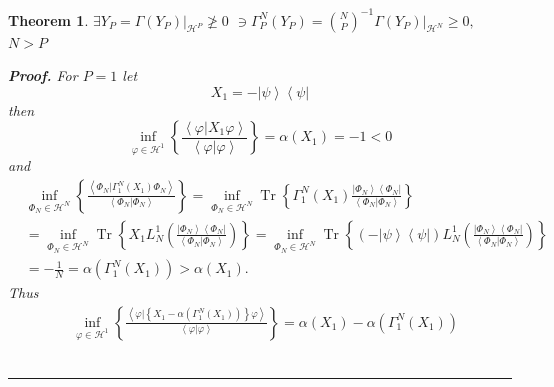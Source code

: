 \documentclass[aps,preprint]{revtex4}%
\newtheorem{theorem}{Theorem}
\newenvironment{proof}[1][Proof]{\noindent\textbf{#1.} }{\ \rule{0.5em}{0.5em}}
\begin{document}
\begin{theorem}
$\exists Y_{P}=\left.  \Gamma\left(  Y_{P}\right)  \right\vert _{\mathcal{H}%
^{P}}\ngeq0$ $\ni\Gamma_{P}^{N}\left(  Y_{P}\right)  =\binom{N}{P}^{-1}\left.
\Gamma\left(  Y_{P}\right)  \right\vert _{\mathcal{H}^{N}}\geq0,$ $N>P$

\begin{proof}
For $P=1$ let
\begin{equation}
X_{1}=-\left\vert \psi\right\rangle \left\langle \psi\right\vert
\end{equation}
then
\begin{equation}
\inf_{\varphi\in\mathcal{H}^{1}}\left\{  \frac{\left\langle \left.
\varphi\right\vert X_{1}\varphi\right\rangle }{\left\langle \left.
\varphi\right\vert \varphi\right\rangle }\right\}  =\alpha\left(
X_{1}\right)  =-1<0
\end{equation}
and
\begin{align}
&  \inf_{\Phi_{N}\in\mathcal{H}^{N}}\left\{  \frac{\left\langle \left.
\Phi_{N}\right\vert \Gamma_{1}^{N}\left(  X_{1}\right)  \Phi_{N}\right\rangle
}{\left\langle \left.  \Phi_{N}\right\vert \Phi_{N}\right\rangle }\right\}
=\inf_{\Phi_{N}\in\mathcal{H}^{N}}\operatorname{Tr}\left\{  \Gamma_{1}%
^{N}\left(  X_{1}\right)  \frac{\left\vert \Phi_{N}\right\rangle \left\langle
\Phi_{N}\right\vert }{\left\langle \left.  \Phi_{N}\right\vert \Phi
_{N}\right\rangle }\right\} \nonumber\\
&  =\inf_{\Phi_{N}\in\mathcal{H}^{N}}\operatorname{Tr}\left\{  X_{1}L_{N}%
^{1}\left(  \frac{\left\vert \Phi_{N}\right\rangle \left\langle \Phi
_{N}\right\vert }{\left\langle \left.  \Phi_{N}\right\vert \Phi_{N}%
\right\rangle }\right)  \right\}  =\inf_{\Phi_{N}\in\mathcal{H}^{N}%
}\operatorname{Tr}\left\{  \left(  -\left\vert \psi\right\rangle \left\langle
\psi\right\vert \right)  L_{N}^{1}\left(  \frac{\left\vert \Phi_{N}%
\right\rangle \left\langle \Phi_{N}\right\vert }{\left\langle \left.  \Phi
_{N}\right\vert \Phi_{N}\right\rangle }\right)  \right\} \nonumber\\
&  =-\frac{1}{N}=\alpha\left(  \Gamma_{1}^{N}\left(  X_{1}\right)  \right)
>\alpha\left(  X_{1}\right)  .
\end{align}
Thus
\begin{align}
&  \inf_{\varphi\in\mathcal{H}^{1}}\left\{  \frac{\left\langle \left.
\varphi\right\vert \left\{  X_{1}-\alpha\left(  \Gamma_{1}^{N}\left(
X_{1}\right)  \right)  \right\}  \varphi\right\rangle }{\left\langle \left.
\varphi\right\vert \varphi\right\rangle }\right\}  =\alpha\left(
X_{1}\right)  -\alpha\left(  \Gamma_{1}^{N}\left(  X_{1}\right)  \right)

\end{align}
\end{proof}
\end{theorem}
\end{document}
